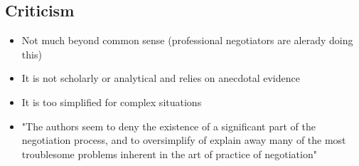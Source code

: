 \subsection{Criticism}

\begin{itemize}
    \item Not much beyond common sense (professional negotiators are alerady doing this)
    \item It is not scholarly or analytical and relies on anecdotal evidence
    \item It is too simplified for complex situations
    \item "The authors seem to deny the existence of a significant part of the
        negotiation process, and to oversimplify of explain away many of the most
        troublesome problems inherent in the art of practice of negotiation"
\end{itemize}